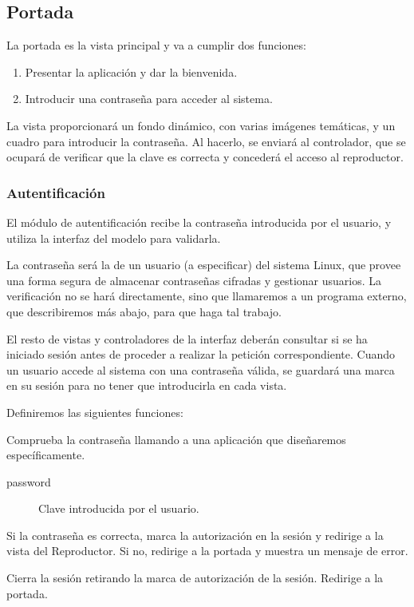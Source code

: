 \smallskip

\subsection{Portada}

La portada es la vista principal y va a cumplir dos funciones:

\begin{enumerate}
	\item Presentar la aplicación y dar la bienvenida.
	\item Introducir una contraseña para acceder al sistema.
\end{enumerate}

La vista proporcionará un fondo dinámico, con varias imágenes temáticas, y un cuadro para introducir la contraseña. Al hacerlo, se enviará al controlador, que se ocupará de verificar que la clave es correcta y concederá el acceso al reproductor.

\subsubsection{Autentificación}

El módulo de autentificación recibe la contraseña introducida por el usuario, y utiliza la interfaz del modelo para validarla.

La contraseña será la de un usuario (a especificar) del sistema Linux, que provee una forma segura de almacenar contraseñas cifradas y gestionar usuarios. La verificación no se hará directamente, sino que llamaremos a un programa externo, que describiremos más abajo, para que haga tal trabajo.

El resto de vistas y controladores de la interfaz deberán consultar si se ha iniciado sesión antes de proceder a realizar la petición correspondiente. Cuando un usuario accede al sistema con una contraseña válida, se guardará una marca en su sesión para no tener que introducirla en cada vista.

Definiremos las siguientes funciones:

\begin{description}[style=nextline]
	\item[login (password)]
	Comprueba la contraseña llamando a una aplicación que diseñaremos específicamente.
	
	\begin{description}
		\item[password] Clave introducida por el usuario.
	\end{description}
	
	Si la contraseña es correcta, marca la autorización en la sesión y redirige a la vista del Reproductor. Si no, redirige a la portada y muestra un mensaje de error.
	
	\item[logout ()]
	Cierra la sesión retirando la marca de autorización de la sesión. Redirige a la portada.
	
\end{description}

